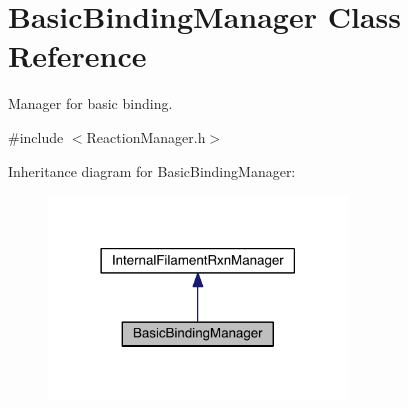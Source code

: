 \hypertarget{classBasicBindingManager}{\section{Basic\+Binding\+Manager Class Reference}
\label{classBasicBindingManager}
}


Manager for basic binding.  




{\ttfamily \#include $<$Reaction\+Manager.\+h$>$}



Inheritance diagram for Basic\+Binding\+Manager\+:
\nopagebreak
\begin{figure}[H]
\begin{center}
\leavevmode
\includegraphics[width=225pt]{classBasicBindingManager__inherit__graph}
\end{center}
\end{figure}


